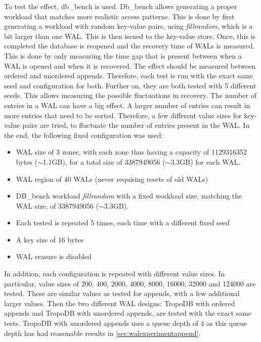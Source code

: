To test the effect, db\_bench is used. Db\_bench allows generating a proper workload that matches more realistic access patterns. This is done by first generating a workload with random key-value pairs, using \textit{fillrandom}, which is a bit larger than one WAL. This is then issued to the key-value store. Once, this is completed the database is reopened and the recovery time of WALs is measured. This is done by only measuring the time gap that is present between when a WAL is opened and when it is recovered. The effect should be measured between ordered and unordered appends. Therefore, each test is run with the exact same seed and configuration for both. Further on, they are both tested with 5 different seeds. This allows measuring the possible fluctuations in recovery. The number of entries in a WAL can have a big effect. A larger number of entries can result in more entries that need to be sorted. Therefore, a few different value sizes for key-value pairs are tried, to fluctuate the number of entries present in the WAL.
In the end, the following fixed configuration was used:
\begin{itemize}
    \item WAL size of 3 zones, with each zone thus having a capacity of 1129316352 bytes ($\sim$1.1GB), for a total size of 3387949056 ($\sim$3.3GB) for each WAL.
    \item WAL region of 40 WALs (never requiring resets of old WALs)
    \item DB\_bench workload \textit{fillrandom} with a fixed workload size, matching the WAL size, of 3387949056 ($\sim$3.3GB).
    \item Each tested is repeated 5 times, each time with a different fixed seed
    \item A key size of 16 bytes 
    \item WAL erasure is disabled
\end{itemize}
In addition, each configuration is repeated with different value sizes. In particular, value sizes of 200, 400, 2000, 4000, 8000, 16000, 32000 and 124000 are tested. These are similar values as tested for appends, with a few additional larger values. Then the two different WAL designs: TropoDB with ordered appends and TropoDB with unordered appends, are tested with the exact same tests. TropoDB with unordered appends uses a queue depth of 4 as this queue depth has had reasonable results in \autoref{sec:walexperimentappend}.

